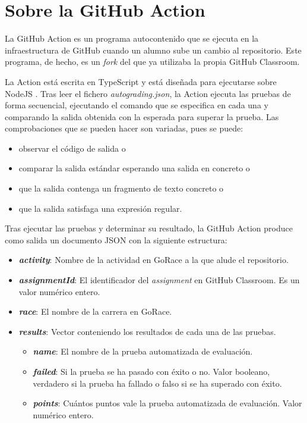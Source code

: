 \section{Sobre la GitHub Action}
La GitHub Action es un programa autocontenido que se ejecuta en la infraestructura de GitHub cuando un alumno sube un cambio al repositorio. Este programa, de hecho, es un \textit{fork} del que ya utilizaba la propia GitHub Classroom\cite{githubGitHubEducationautograding}.

La Action está escrita en TypeScript \cite{typescript} y está diseñada para ejecutarse sobre NodeJS \cite{nodejs}. Tras leer el fichero \textit{autograding.json}, la Action ejecuta las pruebas de forma secuencial, ejecutando el comando que se especifica en cada una y comparando la salida obtenida con la esperada para superar la prueba. Las comprobaciones que se pueden hacer son variadas, pues se puede:
\begin{itemize}
    \item observar el código de salida \cite{exitcode} o 
    \item comparar la salida estándar esperando una salida en concreto o
    \item que la salida contenga un fragmento de texto concreto o 
    \item que la salida satisfaga una expresión regular.
\end{itemize}

Tras ejecutar las pruebas y determinar su resultado, la GitHub Action produce como salida un documento \acrshort{JSON} con la siguiente estructura:
\begin{itemize}
    \item \textbf{\textit{activity}}: Nombre de la actividad en GoRace a la que alude el repositorio.
    \item \textbf{\textit{assignmentId}}: El identificador del \textit{assignment} en GitHub Classroom. Es un valor numérico entero.
    \item \textbf{\textit{race}}: El nombre de la carrera en GoRace.
    \item \textbf{\textit{results}}: Vector conteniendo los resultados de cada una de las pruebas.
    \begin{itemize}
        \item \textbf{\textit{name}}: El nombre de la prueba automatizada de evaluación.
        \item \textbf{\textit{failed}}: Si la prueba se ha pasado con éxito o no. Valor booleano, verdadero si la prueba ha fallado o falso si se ha superado con éxito.
        \item \textbf{\textit{points}}: Cuántos puntos vale la prueba automatizada de evaluación. Valor numérico entero.
    \end{itemize}
\end{itemize}

